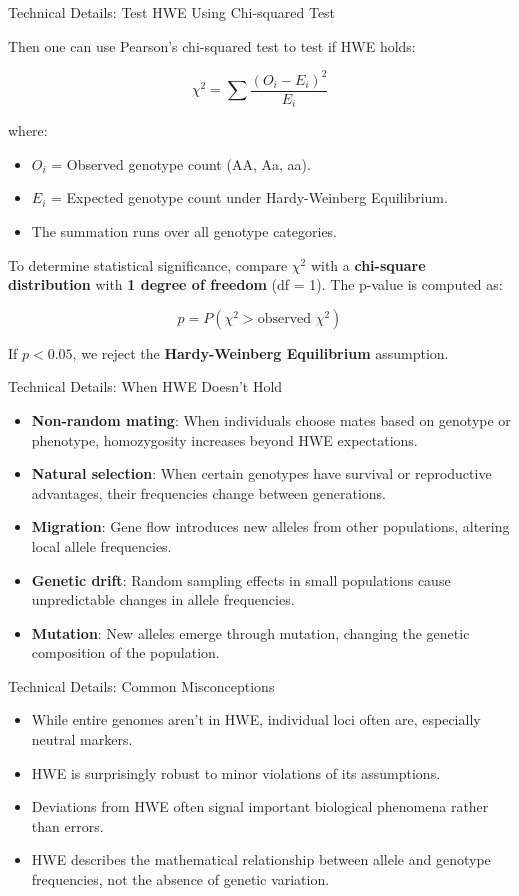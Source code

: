 \begin{frame}{Technical Details: Test HWE Using Chi-squared Test}

Then one can use Pearson's chi-squared test to test if HWE holds:

$$
\chi^2 = \sum \frac{(O_i - E_i)^2}{E_i}
$$

where:  
\begin{itemize}
\item $O_i$ = Observed genotype count (AA, Aa, aa).  
\item $E_i$ = Expected genotype count under Hardy-Weinberg Equilibrium.  
\item The summation runs over all genotype categories.  
\end{itemize}

To determine statistical significance, compare $\chi^2$ with a \textbf{chi-square distribution} with \textbf{1 degree of freedom} (df = 1). The p-value is computed as:

$$
p = P(\chi^2 > \text{observed } \chi^2)
$$

If $p < 0.05$, we reject the \textbf{Hardy-Weinberg Equilibrium} assumption.
\end{frame}

\begin{frame}{Technical Details: When HWE Doesn't Hold}
\begin{itemize}
\item \textbf{Non-random mating}: When individuals choose mates based on genotype or phenotype, homozygosity increases beyond HWE expectations.
\item \textbf{Natural selection}: When certain genotypes have survival or reproductive advantages, their frequencies change between generations.
\item \textbf{Migration}: Gene flow introduces new alleles from other populations, altering local allele frequencies.
\item \textbf{Genetic drift}: Random sampling effects in small populations cause unpredictable changes in allele frequencies.
\item \textbf{Mutation}: New alleles emerge through mutation, changing the genetic composition of the population.
\end{itemize}

\end{frame}

\begin{frame}{Technical Details: Common Misconceptions}
\begin{itemize}
\item While entire genomes aren't in HWE, individual loci often are, especially neutral markers.
\item HWE is surprisingly robust to minor violations of its assumptions.
\item Deviations from HWE often signal important biological phenomena rather than errors.
\item HWE describes the mathematical relationship between allele and genotype frequencies, not the absence of genetic variation.
\end{itemize}

\end{frame}

